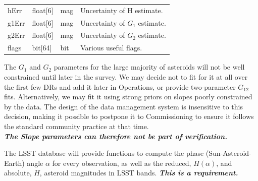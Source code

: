 \documentclass[12pt]{article}
\newcommand{\annotate}[1]{{\color{magenta}\large\textbf{\emph{#1}}}}
\begin{document}
\begin{center}
\begin{longtable}{p{3cm}p{2cm}p{2cm}p{5cm}}
hErr & float[6] & mag & Uncertainty of H estimate.\\

g1Err & float[6] & mag & Uncertainty of $G_1$ estimate. \\

g2Err & float[6] & mag & Uncertainty of $G_2$ estimate. \\

flags & bit[64] & bit & Various useful flags. \\ \hline

\end{longtable}
\end{center}

The $G_1$ and $G_2$ parameters for the large majority of asteroids will not be well constrained until later in the survey. We may decide not to fit for it at all over the first few DRs and add it later in Operations, or provide two-parameter $G_{12}$ fits. Alternatively, we may fit it using strong priors on slopes poorly constrained by the data. The design of the data management system is insensitive to this decision, making it possible to postpone it to Commissioning to ensure it follows the standard community practice at that time.
\\

\annotate{The Slope parameters can therefore not be part of verification.}

The LSST database will provide functions to compute the phase (Sun-Asteroid-Earth) angle $\alpha$ for every observation, as well as the reduced, $H(\alpha)$, and absolute, $H$, asteroid magnitudes in LSST bands. \annotate{This is a requirement.}
\end{document}

